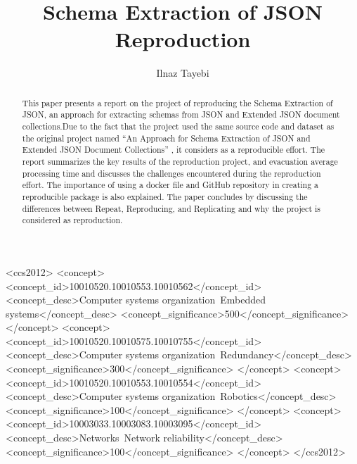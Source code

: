 \documentclass[sigconf]{acmart}
\begin{document}
\twocolumn
\title{Schema Extraction of JSON Reproduction}
\author{Ilnaz Tayebi}

\fancyfoot{}
\thispagestyle{empty}
\begin{abstract}
This paper presents a report on the project of reproducing the Schema Extraction of JSON, an approach for extracting schemas from JSON and Extended JSON document collections.Due to the fact that the project used the same source code \cite{JSONSchemaDiscovery2013} and dataset as the original project named ``An Approach for Schema Extraction of JSON and Extended JSON Document Collections'' \cite{8424731}, it considers as a reproducible effort. The report summarizes the key results of the reproduction project, and evacuation average processing time and discusses the challenges encountered during the reproduction effort. The importance of using a docker file and GitHub repository in creating a reproducible package is also explained. The paper concludes by discussing the differences between Repeat, Reproducing, and Replicating and why the project is considered as reproduction.
 \end{abstract}
 \maketitle
\begin{CCSXML}
<ccs2012>
 <concept>
  <concept_id>10010520.10010553.10010562</concept_id>
  <concept_desc>Computer systems organization~Embedded systems</concept_desc>
  <concept_significance>500</concept_significance>
 </concept>
 <concept>
  <concept_id>10010520.10010575.10010755</concept_id>
  <concept_desc>Computer systems organization~Redundancy</concept_desc>
  <concept_significance>300</concept_significance>
 </concept>
 <concept>
  <concept_id>10010520.10010553.10010554</concept_id>
  <concept_desc>Computer systems organization~Robotics</concept_desc>
  <concept_significance>100</concept_significance>
 </concept>
 <concept>
  <concept_id>10003033.10003083.10003095</concept_id>
  <concept_desc>Networks~Network reliability</concept_desc>
  <concept_significance>100</concept_significance>
 </concept>
</ccs2012>
\end{CCSXML}

\end{document}
